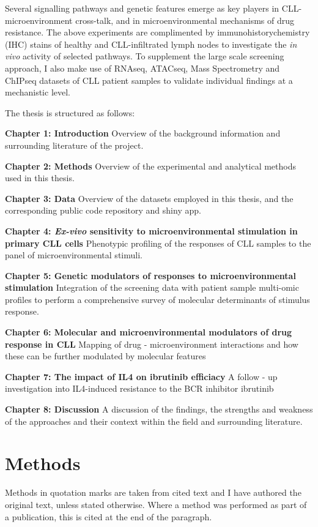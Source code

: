 \documentclass[11pt, a4paper, twosided]{book}
\begin{document}
Several signalling pathways and genetic features emerge as key players in CLL-microenvironment cross-talk, and in microenvironmental mechanisms of drug resistance. The above experiments are complimented by immunohistorychemistry (IHC) stains of healthy and CLL-infiltrated lymph nodes to investigate the \emph{in vivo} activity of selected pathways. To supplement the large scale screening approach, I also make use of RNAseq, ATACseq, Mass Spectrometry and ChIPseq datasets of CLL patient samples to validate individual findings at a mechanistic level.

The thesis is structured as follows:

\textbf{Chapter 1: Introduction} Overview of the background information and surrounding literature of the project.

\textbf{Chapter 2: Methods} Overview of the experimental and analytical methods used in this thesis.

\textbf{Chapter 3: Data} Overview of the datasets employed in this thesis, and the corresponding public code repository and shiny app.

\textbf{Chapter 4: \emph{Ex-vivo} sensitivity to microenvironmental stimulation in primary CLL cells }
Phenotypic profiling of the responses of CLL samples to the panel of microenvironmental stimuli.

\textbf{Chapter 5: Genetic modulators of responses to microenvironmental stimulation} Integration of the screening data with patient sample multi-omic profiles to perform a comprehensive survey of molecular determinants of stimulus response.

\textbf{Chapter 6: Molecular and microenvironmental modulators of drug response in CLL} Mapping of drug - microenvironment interactions and how these can be further modulated by molecular features

\textbf{Chapter 7: The impact of IL4 on ibrutinib efficiacy } A follow - up investigation into IL4-induced resistance to the BCR inhibitor ibrutinib

\textbf{Chapter 8: Discussion } A discussion of the findings, the strengths and weakness of the approaches and their context within the field and surrounding literature.

\hypertarget{methods}{%
\chapter{Methods}\label{methods}}

Methods in quotation marks are taken from cited text and I have authored the original text, unless stated otherwise. Where a method was performed as part of a publication, this is cited at the end of the paragraph.
\end{document}
